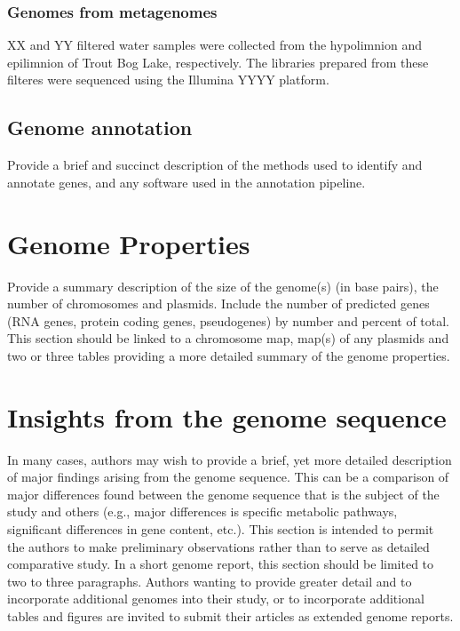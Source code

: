 \documentclass{bmcart}
\begin{document}
\subsubsection*{Genomes from metagenomes}
XX and YY filtered water samples were collected from the hypolimnion and epilimnion of Trout Bog Lake, respectively.  The libraries prepared from these filteres were sequenced using the Illumina YYYY platform.


\subsection*{Genome annotation}
Provide a brief and succinct description of the methods used to identify and annotate genes, and any software used in the annotation pipeline.

\section*{Genome Properties}
Provide a summary description of the size of the genome(s) (in base pairs), the number of chromosomes and plasmids. Include the number of predicted genes (RNA genes, protein coding genes, pseudogenes) by number and percent of total. This section should be linked to a chromosome map, map(s) of any plasmids and two or three tables providing a more detailed summary of the genome properties.

\section*{Insights from the genome sequence}
In many cases, authors may wish to provide a brief, yet more detailed description of major findings arising from the genome sequence. This can be a comparison of major differences found between the genome sequence that is the subject of the study and others (e.g., major differences is specific metabolic pathways, significant differences in gene content, etc.). This section is intended to permit the authors to make preliminary observations rather than to serve as detailed comparative study. In a short genome report, this section should be limited to two to three paragraphs. Authors wanting to provide greater detail and to incorporate additional genomes into their study, or to incorporate additional tables and figures are invited to submit their articles as extended genome reports.
\end{document}
